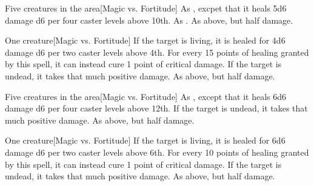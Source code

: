\spellrng{\rngclose}
\begin{spelltargets}{Five creatures in the area}[Magic vs. Fortitude]
    \spelleffect As , excpet that it heals 5d6 damage \add d6 per four caster levels above 10th.
    \spellsuccess As .
    \spellfailure As above, but half damage.
\end{spelltargets}

\spellrng{\rngclose}
\begin{spelltarget}{One creature}[Magic vs. Fortitude]
    \spelleffect If the target is living, it is healed for 4d6 damage \add d6 per two caster levels above 4th. For every 15 points of healing granted by this spell, it can instead cure 1 point of critical damage.
    \spellsuccess If the target is undead, it takes that much positive damage.
    \spellfailure As above, but half damage.
\end{spelltarget}

\begin{spelltargets}{Five creatures in the area}[Magic vs. Fortitude]
    \spelleffect As , except that it heals 6d6 damage \add d6 per four caster levels above 12th.
    \spellsuccess If the target is undead, it takes that much positive damage.
    \spellfailure As above, but half damage.
\end{spelltargets}

\spellrng{\rngclose}
\begin{spelltarget}{One creature}[Magic vs. Fortitude]
    \spelleffect If the target is living, it is healed for 6d6 damage \add d6 per two caster levels above 6th. For every 10 points of healing granted by this spell, it can instead cure 1 point of critical damage.
    \spellsuccess If the target is undead, it takes that much positive damage.
    \spellfailure As above, but half damage.
\end{spelltarget}

